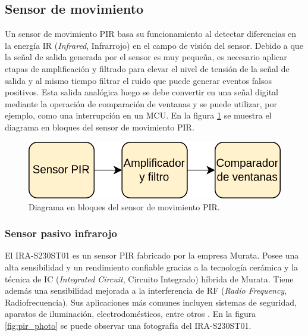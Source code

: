 \subsection{Sensor de movimiento}
Un sensor de movimiento PIR basa su funcionamiento al detectar diferencias en la energía IR (\textit{Infrared}, Infrarrojo) en el campo de visión del sensor. Debido a que la señal de salida generada por el sensor es muy pequeña, es necesario aplicar etapas de amplificación y filtrado para elevar el nivel de tensión de la señal de salida y al mismo tiempo filtrar el ruido que puede generar eventos falsos positivos. Esta salida analógica luego se debe convertir en una señal digital mediante la operación de comparación de ventanas y se puede utilizar, por ejemplo, como una interrupción en un MCU. En la figura \ref{fig:move_blocks} se muestra el diagrama en bloques del sensor de movimiento PIR.

\begin{figure}[h]
	\centering
	\includegraphics[scale=0.25]{./Figures/move_blocks.png}
	\caption{Diagrama en bloques del sensor de movimiento PIR.}
	\label{fig:move_blocks}
\end{figure}

\subsubsection{Sensor pasivo infrarojo}
El IRA-S230ST01 es un sensor PIR fabricado por la empresa Murata. Posee una alta sensibilidad y un rendimiento confiable gracias a la tecnología cerámica y la técnica de IC (\textit{Integrated Circuit}, Circuito Integrado) híbrida de Murata. Tiene además una sensibilidad mejorada a la interferencia de RF (\textit{Radio Frequency}, Radiofrecuencia). Sus aplicaciones más comunes incluyen sistemas de seguridad, aparatos de iluminación, electrodomésticos, entre otros \cite{pir_info}. En la figura \ref{fig:pir_photo} se puede observar una fotografía del IRA-S230ST01.

\vspace*{60 px}

